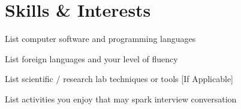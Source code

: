 \documentclass[11pt]{article} %
\begin{document}
\section{Skills \& Interests}
\begin{description}[itemsep=0pt]
        \item[Technical] List computer software and programming languages
        \item[Language] List foreign languages and your level of fluency
        \item[Laboratory] List scientific / research lab techniques or tools [If Applicable]
        \item[Interests] List activities you enjoy that may spark interview conversation
\end{description}
\end{document}
